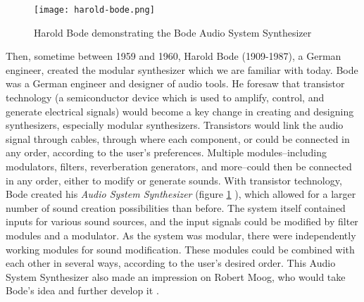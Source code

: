 \begin{figure}
  \centering
  \texttt{[image: harold-bode.png]}
  \caption{Harold Bode demonstrating the Bode Audio System Synthesizer}
  \label{fig:harold-bode}
\end{figure}


Then, sometime between 1959 and 1960, Harold Bode (1909-1987), a German engineer, created the modular synthesizer which we are familiar with today. Bode was a German engineer and designer of audio tools. He foresaw that transistor technology (a semiconductor device which is used to amplify, control, and generate electrical signals) would become a key change in creating and designing synthesizers, especially modular synthesizers\cite{Gabrielli_2020}. Transistors would link the audio signal through cables, through where each component, or  could be connected in any order, according to the user's preferences. Multiple modules--including modulators, filters, reverberation generators, and more--could then be connected in any order, either to modify or generate sounds. With transistor technology, Bode created his \textit{Audio System Synthesizer} (figure \ref{fig:harold-bode} \cite{Crab_2019b}), which allowed for a larger number of sound creation possibilities than before. The system itself contained inputs for various sound sources, and the input signals could be modified by filter modules and a modulator\cite{Bode_1984}. As the system was modular, there were independently working modules for sound modification. These modules could be combined with each other in several ways, according to the user's desired order. This Audio System Synthesizer also made an impression on Robert Moog, who would take Bode's idea and further develop it \cite{Gabrielli_2020}. 

